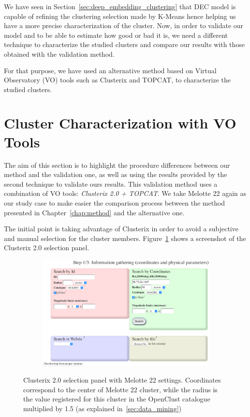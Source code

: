 \documentclass[11pt, a4paper, english]{book}
\begin{document}
We have seen in Section~\ref{sec:deep_embedding_clustering} that DEC model is capable
of refining the clustering selection made by K-Means
hence helping us have a more precise characterization of the cluster.
Now, in order to validate our model and to be able to estimate how good or bad it is,
we need a different technique to characterize the studied clusters and compare our results
with those obtained with the validation method.

For that purpose, we have used an alternative method based on Virtual Observatory (VO) tools
such as Clusterix and TOPCAT, to characterize the studied clusters.

\section{Cluster Characterization with VO Tools}

The aim of this section is to highlight the procedure differences between our method and the validation one,
as well as using the results provided by the second technique to validate ours results.
This validation method uses a combination of VO tools: \emph{Clusterix 2.0 + TOPCAT}.
We take Melotte 22 again as our study case to make easier the comparison process between
the method presented in Chapter~\ref{chap:method} and the alternative one.

The initial point is taking advantage of Clusterix in order to avoid a subjective
and manual selection for the cluster members.
Figure~\ref{fig:clusterix_selection} shows a screenshot of the Clusterix 2.0 selection panel.

\begin{figure}[htbp]
  \centering
  \begin{subfigure}{0.9\textwidth}
    \centering
    \includegraphics[width=\textwidth]{../figures/clusterix/clusterix_selection_panel_melotte_22.png}
  \end{subfigure}
  \caption{Clusterix 2.0 selection panel with Melotte 22 settings.
           Coordinates correspond to the center of Melotte 22 cluster,
           while the radius is the value registered for this cluster in the
           OpenClust catalogue multiplied by 1.5 (as explained in~\ref{sec:data_mining})}
  \label{fig:clusterix_selection}
\end{figure}
\end{document}
